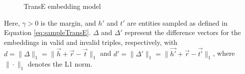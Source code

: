 	
	
	
% 	


\begin{figure}[htp]
	\centering
	\caption{TransE embedding model}
	\label{fig:TransEExplain}
\end{figure}

Here, $\gamma > 0$ is the margin, and $h'$ and $t'$ are entities sampled as defined in Equation \ref{eq:sampleTransE}. $\Delta$ and $\Delta'$ represent the difference vectors for the embeddings in valid and invalid triples, respectively, with $d = \big\|\Delta \big\|_{1} = \big\| \overrightarrow{h} + \overrightarrow{r} - \overrightarrow{t} \big\|_{1}$ and $d' = \big\|\Delta' \big\|_{1} = \big\| \overrightarrow{h'} + \overrightarrow{r} - \overrightarrow{t'} \big\|_{1}$, where $\|\cdot\|_{1}$ denotes the L1 norm.

